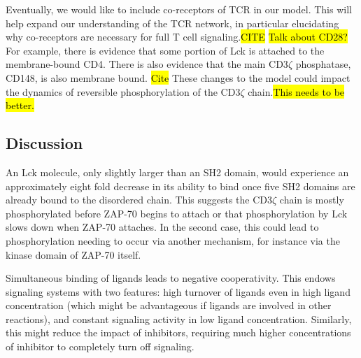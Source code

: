 \documentclass[../../AdvancementSummary.tex]{subfiles}
\begin{document}
Eventually, we would like to include co-receptors of TCR in our model. This will help expand our understanding of the TCR network, in particular elucidating why co-receptors are necessary for full T cell signaling.\hl{CITE} \hl{Talk about CD28?}For example, there is evidence that some portion of Lck is attached to the membrane-bound CD4. There is also evidence that the main CD3$\zeta$ phosphatase, CD148, is also membrane bound. \hl{Cite} These changes to the model could impact the dynamics of reversible phosphorylation of the CD3$\zeta$ chain.\hl{This needs to be better.}




\subsection{Discussion}

An Lck molecule, only slightly larger than an SH2 domain, would experience an approximately eight fold decrease in its ability to bind once five SH2 domains are already bound to the disordered chain. This suggests the CD3$\zeta$ chain is mostly phosphorylated before ZAP-70 begins to attach or that phosphorylation by Lck slows down when ZAP-70 attaches.  In the second case, this could lead to phosphorylation needing to occur via another mechanism, for instance via the kinase domain of ZAP-70 itself.  

Simultaneous binding of ligands leads to negative cooperativity. This endows signaling systems with two features: high turnover of ligands even in high ligand concentration (which might be advantageous if ligands are involved in other reactions), and constant signaling activity in low ligand concentration. Similarly, this might reduce the impact of inhibitors, requiring much higher concentrations of inhibitor to completely turn off signaling.



\end{document}
